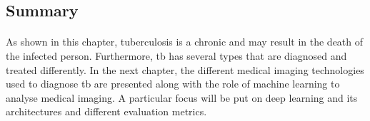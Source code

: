 \subsection*{Summary}
\paragraph{}
As shown in this chapter, tuberculosis is a chronic and may result in the death of the infected person. Furthermore, \acs{tb} has several types that are diagnosed and treated differently. In the next chapter, the different medical imaging technologies used to diagnose \acs{tb} are presented along with the role of machine learning to analyse medical imaging. A particular focus will be put on deep learning and its architectures and different evaluation metrics.